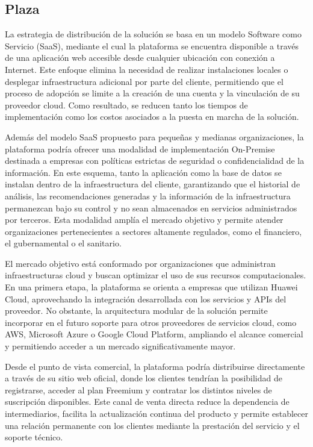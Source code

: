 \subsection{Plaza}

La estrategia de distribución de la solución se basa en un modelo Software como Servicio (SaaS), mediante el cual la plataforma se encuentra disponible a través de una aplicación web accesible desde cualquier ubicación con conexión a Internet. Este enfoque elimina la necesidad de realizar instalaciones locales o desplegar infraestructura adicional por parte del cliente, permitiendo que el proceso de adopción se limite a la creación de una cuenta y la vinculación de su proveedor cloud. Como resultado, se reducen tanto los tiempos de implementación como los costos asociados a la puesta en marcha de la solución.

Además del modelo SaaS propuesto para pequeñas y medianas organizaciones, la plataforma podría ofrecer una modalidad de implementación On-Premise destinada a empresas con políticas estrictas de seguridad o confidencialidad de la información. En este esquema, tanto la aplicación como la base de datos se instalan dentro de la infraestructura del cliente, garantizando que el historial de análisis, las recomendaciones generadas y la información de la infraestructura permanezcan bajo su control y no sean almacenados en servicios administrados por terceros. Esta modalidad amplía el mercado objetivo y permite atender organizaciones pertenecientes a sectores altamente regulados, como el financiero, el gubernamental o el sanitario.

El mercado objetivo está conformado por organizaciones que administran infraestructuras cloud y buscan optimizar el uso de sus recursos computacionales. En una primera etapa, la plataforma se orienta a empresas que utilizan Huawei Cloud, aprovechando la integración desarrollada con los servicios y APIs del proveedor. No obstante, la arquitectura modular de la solución permite incorporar en el futuro soporte para otros proveedores de servicios cloud, como AWS, Microsoft Azure o Google Cloud Platform, ampliando el alcance comercial y permitiendo acceder a un mercado significativamente mayor.

Desde el punto de vista comercial, la plataforma podría distribuirse directamente a través de su sitio web oficial, donde los clientes tendrían la posibilidad de registrarse, acceder al plan Freemium y contratar los distintos niveles de suscripción disponibles. Este canal de venta directa reduce la dependencia de intermediarios, facilita la actualización continua del producto y permite establecer una relación permanente con los clientes mediante la prestación del servicio y el soporte técnico.

